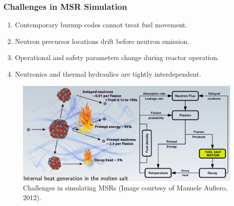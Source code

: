 \begin{frame}
  \frametitle{Challenges in \gls{MSR} Simulation}
                  \vspace*{-0.05in}
               \begin{enumerate}
                \item Contemporary burnup codes cannot treat fuel movement.
                \item Neutron precursor locations drift before neutron emission.
                \item Operational and safety parameters change during reactor operation.
                \item Neutronics and thermal hydraulics are tightly interdependent.
               \end{enumerate}

           \begin{figure}[t]
                \vspace*{-0.05in}
			\hspace*{-0.2in}
                \includegraphics[height=0.47\textwidth]{./images/coupled_physics.png}
		\vspace*{-0.05in}
		\caption{Challenges in simulating \glspl{MSR} (Image courtesy of Manuele Aufiero, 2012).}
     	 \end{figure}               
\end{frame}

